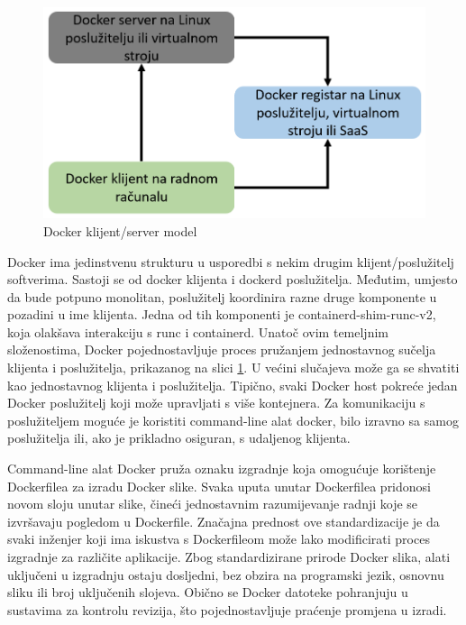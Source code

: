 \documentclass[a4paper,12pt,oneside]{article}
\begin{document}
\begin{figure}[ht!] %
	\centering %
	\includegraphics[scale=0.5]{./Slike/docker klijent-server model.png} %
	\caption{Docker klijent/server model \cite{kane2023docker} \label{f:docker klijent/server model}} %
\end{figure}

Docker ima jedinstvenu strukturu u usporedbi s nekim drugim klijent/poslužitelj softverima. Sastoji se od docker klijenta i dockerd poslužitelja. Međutim, umjesto da bude potpuno monolitan, poslužitelj koordinira razne druge komponente u pozadini u ime klijenta. Jedna od tih komponenti je containerd-shim-runc-v2, koja olakšava interakciju s runc i containerd. Unatoč ovim temeljnim složenostima, Docker pojednostavljuje proces pružanjem jednostavnog sučelja klijenta i poslužitelja, prikazanog na slici \ref{f:docker klijent/server model}. U većini slučajeva može ga se shvatiti kao jednostavnog klijenta i poslužitelja. Tipično, svaki Docker host pokreće jedan Docker poslužitelj koji može upravljati s više kontejnera. Za komunikaciju s poslužiteljem moguće je koristiti command-line alat docker, bilo izravno sa samog poslužitelja ili, ako je prikladno osiguran, s udaljenog klijenta.

Command-line alat Docker pruža oznaku izgradnje koja omogućuje korištenje Dockerfilea za izradu Docker slike. Svaka uputa unutar Dockerfilea pridonosi novom sloju unutar slike, čineći jednostavnim razumijevanje radnji koje se izvršavaju pogledom u Dockerfile. Značajna prednost ove standardizacije je da svaki inženjer koji ima iskustva s Dockerfileom može lako modificirati proces izgradnje za različite aplikacije. Zbog standardizirane prirode Docker slika, alati uključeni u izgradnju ostaju dosljedni, bez obzira na programski jezik, osnovnu sliku ili broj uključenih slojeva. Obično se Docker datoteke pohranjuju u sustavima za kontrolu revizija, što pojednostavljuje praćenje promjena u izradi.
\end{document}
